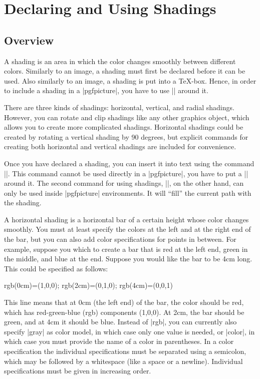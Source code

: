 %


\section{Declaring and Using Shadings}

\label{section-shadings}

\subsection{Overview}

A shading is an area in which the color changes smoothly between different
colors. Similarly to an image, a shading must first be declared before
it can be used. Also similarly to an image, a shading is put into a
\TeX-box. Hence, in order to include a shading in a |{pgfpicture}|,
you have to use |\pgftext| around it.

There are three kinds of shadings: horizontal, vertical, and radial
shadings. However, you can rotate and clip shadings like any other
graphics object, which allows you to create more complicated
shadings. Horizontal shadings could be created by rotating a vertical
shading by 90 degrees, but explicit commands for creating both
horizontal and vertical shadings are included for convenience.

Once you have declared a shading, you can insert it into text using
the command |\pgfuseshading|. This command cannot be used directly in
a |{pgfpicture}|, you have to put a |\pgftext| around it. The second
command for using shadings, |\pgfshadepath|, on the other hand, can
only be used  inside |{pgfpicture}| environments. It will ``fill'' the
current path with the shading.

A horizontal shading is a horizontal bar of a certain height whose
color changes smoothly. You must at least specify the colors at the
left and at the right end of the bar, but you can also add color
specifications for points in between. For example, suppose you
which to create a bar that is red at the left end, green in the
middle, and blue at the end. Suppose you would like the bar to be 4cm
long. This could be specified as follows:
\begin{codeexample}
rgb(0cm)=(1,0,0); rgb(2cm)=(0,1,0); rgb(4cm)=(0,0,1)
\end{codeexample}
This line means that at 0cm (the left end) of the bar, the color
should be red, which has red-green-blue (rgb) components (1,0,0). At
2cm, the bar should be green, and at 4cm it should be blue.
Instead of |rgb|, you can currently also specify |gray| as
color model, in which case only one value is needed, or |color|,
in which case you must provide the name of a color in parentheses. In
a color specification the individual specifications must 
be separated using a semicolon, which may be followed by a whitespace
(like a space or a newline). Individual specifications must be given
in increasing order. 

